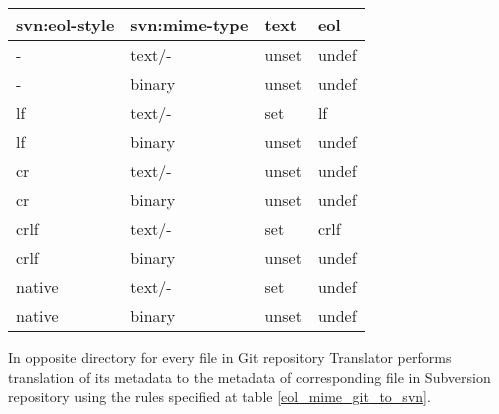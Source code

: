 \begin{center}
\begin{tabular}{ | l | l | l | l |}
	\hline
	svn:eol-style &   svn:mime-type &   text  & eol \\ \hline \hline
	-             &   text/-        &   unset & undef \footnotemark[1] \footnotemark[2] \\ \hline
	-             &   binary        &   unset & undef \\ \hline
	lf            &   text/-        &   set   & lf \\ \hline
	lf            &   binary        &   unset & undef \\ \hline
	cr            &   text/-        &   unset & undef  \footnotemark[3] \\ \hline
	cr            &   binary        &   unset & undef \\ \hline
	crlf          &   text/-        &   set   & crlf \\ \hline
	crlf          &   binary        &   unset & undef \\ \hline
	native        &   text/-        &   set   & undef \footnotemark[4] \\ \hline
	native        &   binary        &   unset & undef \\ \hline
\end{tabular}
\label{eol_mime_svn_to_git}
\end{center}

\clearpage

In opposite directory for every file in Git repository Translator performs translation of its metadata to the metadata of corresponding file in Subversion repository using the rules specified at table \ref{eol_mime_git_to_svn}.

